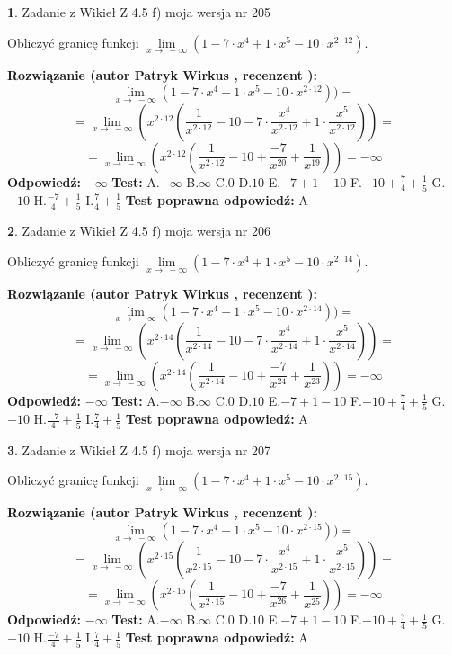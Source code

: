 \documentclass[12pt, a4paper]{article}
\theoremstyle{definition} %
\newtheorem{zad}{}
\newcommand{\zadStart}[1]{\begin{zad}#1\newline}
\newcommand{\zadStop}{\end{zad}}
\newcommand{\rozwStart}[2]{\noindent \textbf{Rozwiązanie (autor #1 , recenzent #2): }\newline}
\newcommand{\rozwStop}{\newline}
\newcommand{\odpStart}{\noindent \textbf{Odpowiedź:}\newline}
\newcommand{\odpStop}{\newline}
\newcommand{\testStart}{\noindent \textbf{Test:}\newline}
\newcommand{\testStop}{\newline}
\newcommand{\kluczStart}{\noindent \textbf{Test poprawna odpowiedź:}\newline}
\newcommand{\kluczStop}{\newline}
\begin{document}
\zadStart{Zadanie z Wikieł Z 4.5 f) moja wersja nr 205}



Obliczyć granicę funkcji  $\lim\limits_{x\to\ -\infty}(1 - 7 \cdot x^{4}+1 \cdot x^{5}- 10 \cdot x^{2\cdot12})$.
\zadStop
\rozwStart{Patryk Wirkus}{}
$$\lim\limits_{x\to\ -\infty}(1 - 7 \cdot x^{4}+1 \cdot x^{5}- 10 \cdot x^{2\cdot12}))=$$
$$=\lim\limits_{x\to\ -\infty}(x^{2\cdot12}(\frac{1}{x^{2\cdot12}}-10 -7 \cdot \frac{x^{4}}{x^{2\cdot12}}+1 \cdot \frac{x^{5}}{x^{2\cdot12}}))=$$
$$=\lim\limits_{x\to\ -\infty}(x^{2\cdot12}(\frac{1}{x^{2\cdot12}}-10 + \frac{-7}{x^{20}}+ \frac{1}{x^{19}}))=-\infty$$
\rozwStop
\odpStart
$-\infty$
\odpStop
\testStart
A.$-\infty$ B.$\infty$ C.$0$ D.$10$ E.$-7 + 1 - 10$
F.$-10+\frac{7}{4}+\frac{1}{5}$ G.$-10$
H.$\frac{-7}{4}+\frac{1}{5}$
I.$\frac{7}{4}+\frac{1}{5}$
\testStop
\kluczStart
A
\kluczStop



\zadStart{Zadanie z Wikieł Z 4.5 f) moja wersja nr 206}



Obliczyć granicę funkcji  $\lim\limits_{x\to\ -\infty}(1 - 7 \cdot x^{4}+1 \cdot x^{5}- 10 \cdot x^{2\cdot14})$.
\zadStop
\rozwStart{Patryk Wirkus}{}
$$\lim\limits_{x\to\ -\infty}(1 - 7 \cdot x^{4}+1 \cdot x^{5}- 10 \cdot x^{2\cdot14}))=$$
$$=\lim\limits_{x\to\ -\infty}(x^{2\cdot14}(\frac{1}{x^{2\cdot14}}-10 -7 \cdot \frac{x^{4}}{x^{2\cdot14}}+1 \cdot \frac{x^{5}}{x^{2\cdot14}}))=$$
$$=\lim\limits_{x\to\ -\infty}(x^{2\cdot14}(\frac{1}{x^{2\cdot14}}-10 + \frac{-7}{x^{24}}+ \frac{1}{x^{23}}))=-\infty$$
\rozwStop
\odpStart
$-\infty$
\odpStop
\testStart
A.$-\infty$ B.$\infty$ C.$0$ D.$10$ E.$-7 + 1 - 10$
F.$-10+\frac{7}{4}+\frac{1}{5}$ G.$-10$
H.$\frac{-7}{4}+\frac{1}{5}$
I.$\frac{7}{4}+\frac{1}{5}$
\testStop
\kluczStart
A
\kluczStop



\zadStart{Zadanie z Wikieł Z 4.5 f) moja wersja nr 207}



Obliczyć granicę funkcji  $\lim\limits_{x\to\ -\infty}(1 - 7 \cdot x^{4}+1 \cdot x^{5}- 10 \cdot x^{2\cdot15})$.
\zadStop
\rozwStart{Patryk Wirkus}{}
$$\lim\limits_{x\to\ -\infty}(1 - 7 \cdot x^{4}+1 \cdot x^{5}- 10 \cdot x^{2\cdot15}))=$$
$$=\lim\limits_{x\to\ -\infty}(x^{2\cdot15}(\frac{1}{x^{2\cdot15}}-10 -7 \cdot \frac{x^{4}}{x^{2\cdot15}}+1 \cdot \frac{x^{5}}{x^{2\cdot15}}))=$$
$$=\lim\limits_{x\to\ -\infty}(x^{2\cdot15}(\frac{1}{x^{2\cdot15}}-10 + \frac{-7}{x^{26}}+ \frac{1}{x^{25}}))=-\infty$$
\rozwStop
\odpStart
$-\infty$
\odpStop
\testStart
A.$-\infty$ B.$\infty$ C.$0$ D.$10$ E.$-7 + 1 - 10$
F.$-10+\frac{7}{4}+\frac{1}{5}$ G.$-10$
H.$\frac{-7}{4}+\frac{1}{5}$
I.$\frac{7}{4}+\frac{1}{5}$
\testStop
\kluczStart
A
\kluczStop
\end{document}
